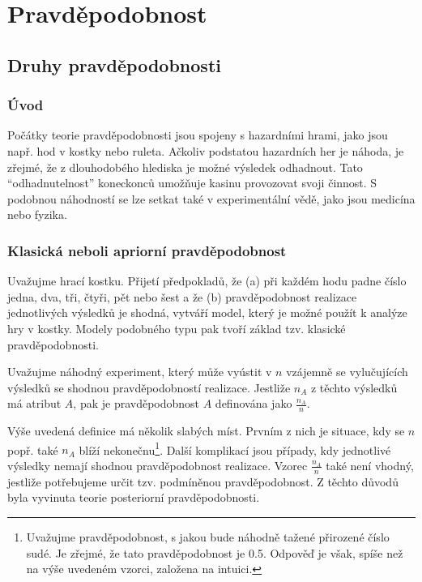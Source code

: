 \chapter{Pravděpodobnost}

\section{Druhy pravděpodobnosti}

\subsection{Úvod}

Počátky teorie pravděpodobnosti jsou spojeny s hazardními hrami, jako jsou např. hod v kostky nebo ruleta. Ačkoliv podstatou hazardních her je náhoda, je zřejmé, že z dlouhodobého hlediska je možné výsledek odhadnout. Tato ``odhadnutelnost'' koneckonců umožňuje kasinu provozovat svoji činnost. S podobnou náhodností se lze setkat také v experimentální vědě, jako jsou medicína nebo fyzika.

\subsection{Klasická neboli apriorní pravděpodobnost}

Uvažujme hrací kostku. Přijetí předpokladů, že (a) při každém hodu padne číslo jedna, dva, tři, čtyři, pět nebo šest a že (b) pravděpodobnost realizace jednotlivých výsledků je shodná, vytváří model, který je možné použít k analýze hry v kostky. Modely podobného typu pak tvoří základ tzv. klasické pravděpodobnosti.

\begin{definition}
Uvažujme náhodný experiment, který může vyústit v $n$ vzájemně se vylučujících výsledků se shodnou pravděpodobností realizace. Jestliže $n_A$ z těchto výsledků má atribut $A$, pak je pravděpodobnost $A$ definována jako $\frac{n_A}{n}$.
\end{definition}

Výše uvedená definice má několik slabých míst. Prvním z nich je situace, kdy se $n$ popř. také $n_A$ blíží nekonečnu\footnote{Uvažujme pravděpodobnost, s jakou bude náhodně tažené přirozené číslo sudé. Je zřejmé, že tato pravděpodobnost je 0.5. Odpověď je však, spíše než na výše uvedeném vzorci, založena na intuici.}. Další komplikací jsou případy, kdy jednotlivé výsledky nemají shodnou pravděpodobnost realizace. Vzorec $\frac{n_A}{n}$ také není vhodný, jestliže potřebujeme určit tzv. podmíněnou pravděpodobnost. Z těchto důvodů byla vyvinuta teorie posteriorní pravděpodobnosti.

